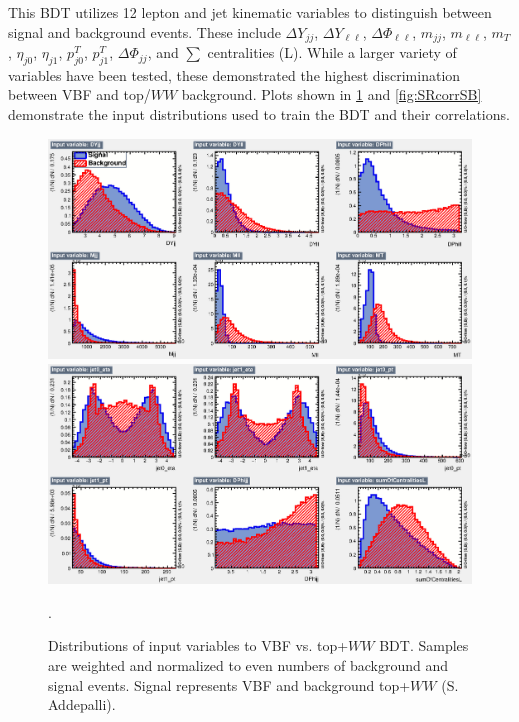 This BDT utilizes 12 lepton and jet kinematic variables to distinguish between signal and background events. These include $\Delta Y_{jj}$, $\Delta Y_{\ell\ell}$, $\Delta \Phi_{\ell\ell}$, $m_{jj}$, $m_{\ell\ell}$, $m_T$, $\eta_{j0}$, $\eta_{j1}$, $p^T_{j0}$, $p^T_{j1}$, $\Delta \Phi_{jj}$, and $\sum$ centralities (L). While a larger variety of variables have been tested, these demonstrated the highest discrimination between VBF and top/$WW$ background. Plots shown in \ref{fig:SRBDTinput} and \ref{fig:SRcorrSB} demonstrate the input distributions used to train the BDT and their correlations.
\begin{figure}[!htbp]
    \centering
    \includegraphics[width=0.55\linewidth]{Pictures/VBFvsWW+Top/variables_id_c1.eps}
    \includegraphics[width=0.55\linewidth]{Pictures/VBFvsWW+Top/variables_id_c2.eps}
    \caption{Distributions of input variables to VBF vs. top+$WW$ BDT. Samples are weighted and normalized to even numbers of background and signal events. Signal represents VBF and background top+$WW$ (S. Addepalli).}.
    \label{fig:SRBDTinput}
\end{figure}

